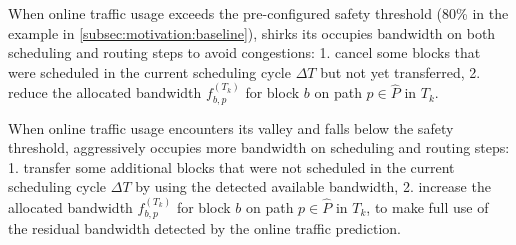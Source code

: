 {\begin{packeditemize}
\item When online traffic usage exceeds the pre-configured safety threshold (80\% in the example in \Section\ref{subsec:motivation:baseline}), \newname shirks its occupies bandwidth on both scheduling and routing steps to avoid congestions: 1. cancel some blocks that were scheduled in the current scheduling cycle $\Delta T$ but not yet transferred, 2. reduce the allocated bandwidth $f_{b,p}^{(T_k)}$ for block $b$ on path $p\in \hat{P}$ in $T_k$.

\item When online traffic usage encounters its valley and falls below the safety threshold, \newname aggressively occupies more bandwidth on scheduling and routing steps: 1. transfer some additional blocks that were not scheduled in the current scheduling cycle $\Delta T$ by using the detected available bandwidth, 2. increase the allocated bandwidth $f_{b,p}^{(T_k)}$ for block $b$ on path $p\in \hat{P}$ in $T_k$, to make full use of the residual bandwidth detected by the online traffic prediction.
\end{packeditemize}





}
